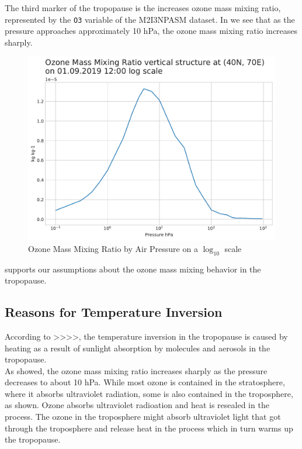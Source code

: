 \documentclass[../00_main.tex]{subfiles}
\begin{document}
The third marker of the tropopause is the increases ozone mass mixing ratio,
represented by the \texttt{O3} variable of the M2I3NPASM dataset. In
 we see that as the pressure approaches approximately 10 hPa, the
ozone mass mixing ratio increases sharply.
\begin{figure}[H]
\center
    \includegraphics[width=\textwidth]{../graphics/ozone_log}
    \vspace{-20pt}
    \caption{Ozone Mass Mixing Ratio by Air Pressure on a $\log_{10}$ scale}
    \label{ozone}
\end{figure}
 supports our assumptions about the ozone mass mixing behavior in
the tropopause.

\subsection{Reasons for Temperature Inversion}

According to >>>>, the temperature inversion in the tropopause is caused by
heating as a result of sunlight absorption by molecules and aerosols in the
tropopause.\\
As  showed, the ozone mass mixing ratio increases sharply as the
pressure decreases to about 10 hPa. While most ozone is contained in the
stratosphere, where it absorbs ultraviolet radiation, some is also contained
in the troposphere, as shown. Ozone absorbs ultraviolet radioation and heat is
resealed in the process.
The ozone in the troposphere might absorb ultraviolet light that got through
the troposphere and release heat in the process which in turn warms up the
tropopause.
\end{document}
